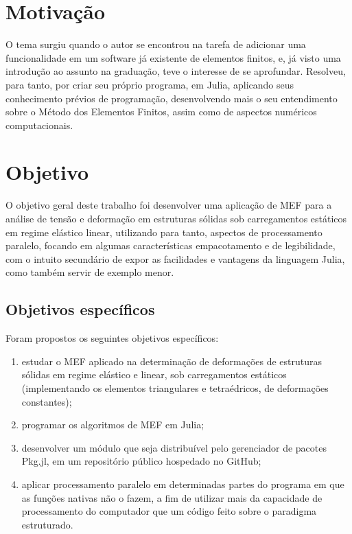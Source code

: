 \section{Motivação}

O tema surgiu quando o autor se encontrou na tarefa de adicionar uma funcionalidade em um software já existente de elementos finitos, e, já visto uma introdução ao assunto na graduação, teve o interesse de se aprofundar. Resolveu, para tanto, por criar seu próprio programa, em Julia, aplicando seus conhecimento prévios de programação, desenvolvendo mais o seu entendimento sobre o Método dos Elementos Finitos, assim como de aspectos numéricos computacionais.


\section{Objetivo}

O objetivo geral deste trabalho foi desenvolver uma aplicação de MEF para a análise de tensão e deformação em estruturas sólidas sob carregamentos estáticos em regime elástico linear, utilizando para tanto, aspectos de processamento paralelo, focando em algumas características empacotamento e de legibilidade, com o intuito secundário de expor as facilidades e vantagens da linguagem Julia, como também servir de exemplo menor.

\subsection{Objetivos específicos}

Foram propostos os seguintes objetivos específicos:

\begin{enumerate}
    \item estudar o MEF aplicado na determinação de deformações de estruturas sólidas em regime elástico e linear, sob carregamentos estáticos (implementando os elementos triangulares e tetraédricos, de deformações constantes);
    \item programar os algoritmos de MEF em Julia;
    \item desenvolver um módulo que seja distribuível pelo gerenciador de pacotes Pkg.jl, em um repositório público hospedado no GitHub;
    \item aplicar processamento paralelo em determinadas partes do programa em que as funções nativas não o fazem, a fim de utilizar mais da capacidade de processamento do computador que um código feito sobre o paradigma estruturado.
\end{enumerate}

